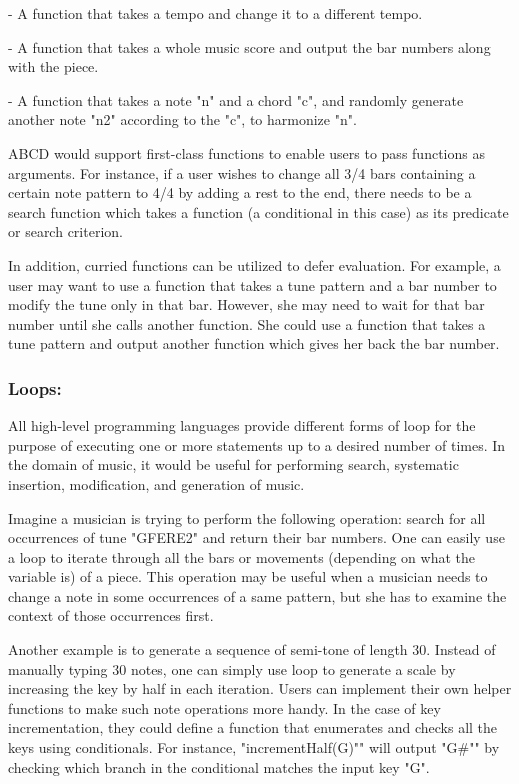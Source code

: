     - A function that takes a tempo and change it to a different tempo.

    - A function that takes a whole music score and output the bar numbers along with the piece.
    
    - A function that takes a note "n" and a chord "c", and randomly generate another note "n2" according to the "c", to harmonize "n".
      
    ABCD would support first-class functions to enable users to pass functions as arguments. For instance, if a user wishes to change all 3/4 bars containing a certain note pattern to 4/4 by adding a rest to the end, there needs to be a search function which takes a function (a conditional in this case) as its predicate or search criterion.

     In addition, curried functions can be utilized to defer evaluation. For example, a user may want to use a function that takes a tune pattern and a bar number to modify the tune only in that bar. However, she may need to wait for that bar number until she calls another function. She could use a function that takes a tune pattern and output another function which gives her back the bar number.  

    \subsubsection{Loops:}
    All high-level programming languages provide different forms of loop for the purpose of executing one or more statements up to a desired number of times. In the domain of music, it would be useful for performing search, systematic insertion, modification, and generation of music. 

    Imagine a musician is trying to perform the following operation: search for all occurrences of tune "GFERE2" and return their bar numbers. One can easily use a loop to iterate through all the bars or movements (depending on what the variable is) of a piece. This operation may be useful when a musician needs to change a note in some occurrences of a same pattern, but she has to examine the context of those occurrences first\cite{SlashdotMedia17}.  

    Another example is to generate a sequence of semi-tone of length 30. Instead of manually typing 30 notes, one can simply use loop to generate a scale by increasing the key by half in each iteration. Users can implement their own helper functions to make such note operations more handy. In the case of key incrementation, they could define a function that enumerates and checks all the keys using conditionals. For instance, "incrementHalf(G)"" will output "G\#"" by checking which branch in the conditional matches the input key "G".

